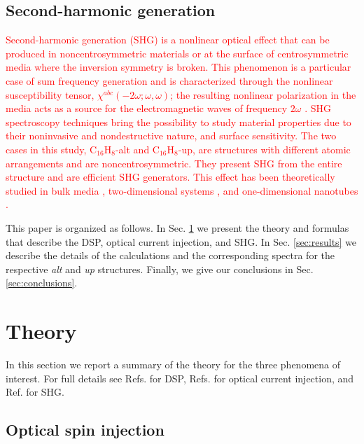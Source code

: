 \documentclass[pss]{wiley2sp} %
\begin{document}
\subsection{Second-harmonic generation}

\textcolor{red}{
Second-harmonic generation (SHG) is a nonlinear optical effect that can be
produced in noncentrosymmetric materials or at the surface of centrosymmetric
media where the inversion symmetry is broken. This phenomenon is a particular
case of sum frequency generation and is characterized through the nonlinear
susceptibility tensor, $\chi^{abc}(-2\omega;\omega,\omega)$; the resulting
nonlinear polarization in the media acts as a source for the electromagnetic
waves of frequency $2\omega$ \cite{loudonOUP00}. SHG spectroscopy techniques
bring the possibility to study material properties due to their noninvasive
and nondestructive nature, and surface sensitivity. The two cases in this
study, C$_{16}$H$_{8}$-alt and C$_{16}$H$_{8}$-up, are structures with
different atomic arrangements and are noncentrosymmetric. They present SHG
from the entire structure and are efficient SHG generators. This effect has
been theoretically studied in bulk media \cite{andersonPRB15,figliozziPRL05},
two-dimensional systems \cite{mendozaPRB97,niAPL03}, and one-dimensional
nanotubes \cite{salazarPRB14,guoPRB05}.
}

This paper is organized as follows. In Sec. \ref{sec:theory} we present the
theory and formulas that describe the DSP, optical current injection, and SHG.
In Sec. \ref{sec:results} we describe the details of the calculations and the
corresponding spectra for the respective \emph{alt} and \emph{up} structures.
Finally, we give our conclusions in Sec. \ref{sec:conclusions}.


\section{Theory}\label{sec:theory}

In this section we report a summary of the theory for the three phenomena of
interest. For full details see Refs. \cite{nastosPRB07,mendozaPRB12} for DSP,
Refs. \cite{cabellosPRB11,sipePRB00} for optical current injection, and Ref.
\cite{andersonPRB15} for SHG. 


\subsection{Optical spin injection}\label{sec:theory-DSP}
\end{document}
